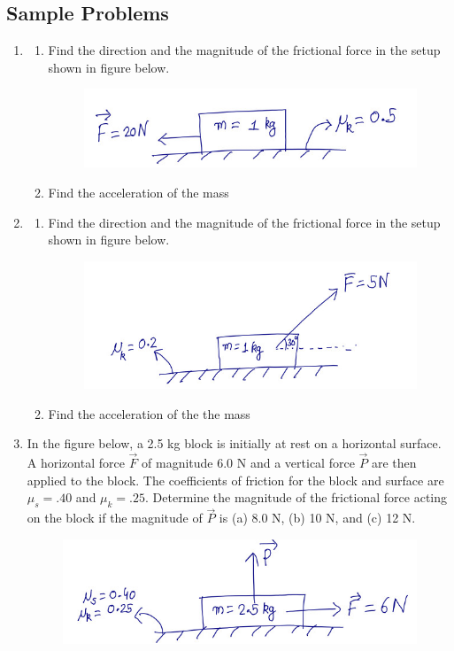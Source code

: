 \documentclass[10pt]{article}
\begin{document}
\subsection{Sample Problems}
\begin{enumerate}
\item \begin{enumerate}
\item Find the direction and the magnitude of the frictional force in the setup shown in figure below.
\begin{figure}[h]
\label{qfric1g}
\includegraphics[scale=.5]{qfric1}
\centering
\end{figure}
\item Find the acceleration of the mass
\end{enumerate}
\item \begin{enumerate}
\item Find the direction and the magnitude of the frictional force in the setup shown in figure below.
\begin{figure}[h]
\label{qfric2g}
\includegraphics[scale=.5]{qfric2}
\centering
\end{figure}
\item Find the acceleration of the the mass
\end{enumerate}
\newpage
\item 
In the figure below, a 2.5 kg block is initially at rest on a horizontal surface.  A horizontal force $\vec{F}$ of magnitude 6.0 N and a vertical force $\vec{P}$ are then applied to the block.  The coefficients of friction for the block and surface are $\mu_s=.40$ and $\mu_k=.25$.  Determine the magnitude of the frictional force acting on the block if the magnitude of $\vec{P}$ is (a) 8.0 N, (b) 10 N, and (c) 12 N.  
\begin{figure}[h]
\label{qfric3g}
\includegraphics[scale=.5]{qfric3}
\centering
\end{figure}
\end{enumerate}
\end{document}
